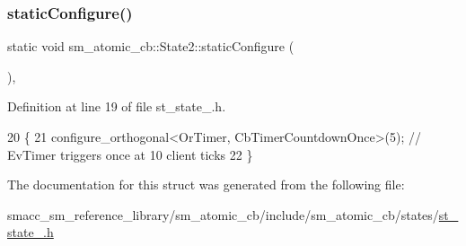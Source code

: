 \subsubsection{\texorpdfstring{static\+Configure()}{staticConfigure()}}
{\footnotesize\ttfamily static void sm\+\_\+atomic\+\_\+cb\+::\+State2\+::static\+Configure (\begin{DoxyParamCaption}{ }\end{DoxyParamCaption})\hspace{0.3cm}{\ttfamily [inline]}, {\ttfamily [static]}}



Definition at line 19 of file st\+\_\+state\+\_.\+h.


\begin{DoxyCode}
20     \{
21         configure\_orthogonal<OrTimer, CbTimerCountdownOnce>(5); \textcolor{comment}{// EvTimer triggers once at 10 client ticks}
22     \}
\end{DoxyCode}


The documentation for this struct was generated from the following file\+:\begin{DoxyCompactItemize}
\item 
smacc\+\_\+sm\+\_\+reference\+\_\+library/sm\+\_\+atomic\+\_\+cb/include/sm\+\_\+atomic\+\_\+cb/states/\hyperlink{sm__atomic__cb_2include_2sm__atomic__cb_2states_2st__state__2_8h}{st\+\_\+state\+\_.\+h}\end{DoxyCompactItemize}
